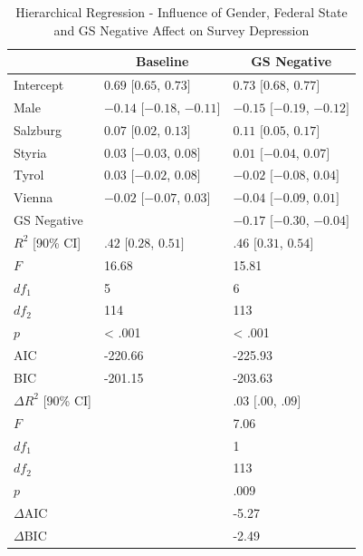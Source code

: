 \documentclass[
  english,
  jou,floatsintext]{apa7}
\begin{document}
\begin{table}[tbp]

\begin{center}
\begin{threeparttable}

\caption{\label{tab:table-depr-GS}Hierarchical Regression - Influence of Gender, Federal State and GS Negative Affect on Survey Depression}

\small{

\begin{tabular}{lll}
\toprule
 & \multicolumn{1}{c}{Baseline} & \multicolumn{1}{c}{GS Negative}\\
\midrule
Intercept & $0.69$ $[0.65$, $0.73]$ & $0.73$ $[0.68$, $0.77]$\\
Male & $-0.14$ $[-0.18$, $-0.11]$ & $-0.15$ $[-0.19$, $-0.12]$\\
Salzburg & $0.07$ $[0.02$, $0.13]$ & $0.11$ $[0.05$, $0.17]$\\
Styria & $0.03$ $[-0.03$, $0.08]$ & $0.01$ $[-0.04$, $0.07]$\\
Tyrol & $0.03$ $[-0.02$, $0.08]$ & $-0.02$ $[-0.08$, $0.04]$\\
Vienna & $-0.02$ $[-0.07$, $0.03]$ & $-0.04$ $[-0.09$, $0.01]$\\
GS Negative &  & $-0.17$ $[-0.30$, $-0.04]$\\
$R^2$ [90\% CI] & $.42$ $[0.28$, $0.51]$ & $.46$ $[0.31$, $0.54]$\\
$F$ & 16.68 & 15.81\\
$df_1$ & 5 & 6\\
$df_2$ & 114 & 113\\
$p$ & < .001 & < .001\\
$\mathrm{AIC}$ & -220.66 & -225.93\\
$\mathrm{BIC}$ & -201.15 & -203.63\\
$\Delta R^2$ [90\% CI] &  & $.03$ $[.00$, $.09]$\\
$F$ &  & 7.06\\
$df_1$ &  & 1\\
$df_2$ &  & 113\\
$p$ &  & .009\\
$\Delta \mathrm{AIC}$ &  & -5.27\\
$\Delta \mathrm{BIC}$ &  & -2.49\\
\bottomrule
\end{tabular}

}

\end{threeparttable}
\end{center}

\end{table}
\end{document}

